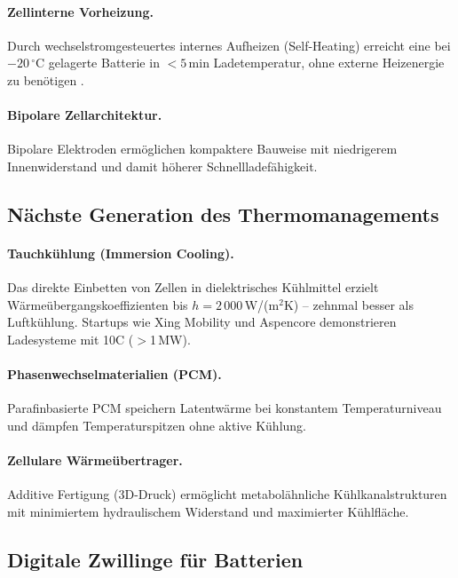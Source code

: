 ﻿\documentclass[a4paper,12pt]{article}
\theoremstyle{definition}
\begin{document}
\paragraph{Zellinterne Vorheizung.}
Durch wechselstromgesteuertes internes Aufheizen (Self-Heating) erreicht
eine bei $-20\,^{\circ}\mathrm{C}$ gelagerte Batterie in $<5$\,min Ladetemperatur, ohne
externe Heizenergie zu ben\"otigen \cite{Wang2019}.

\paragraph{Bipolare Zellarchitektur.}
Bipolare Elektroden ermöglichen kompaktere Bauweise mit niedrigerem
Innenwiderstand und damit h\"oherer Schnellladef\"ahigkeit.

\subsection{N\"achste Generation des Thermomanagements}

\paragraph{Tauchk\"uhlung (Immersion Cooling).}
Das direkte Einbetten von Zellen in dielektrisches K\"uhlmittel erzielt
W\"arme\"ubergangskoeffizienten bis $h = 2\,000$\,W/(m$^2$K) --
zehnmal besser als Luftk\"uhlung. Startups wie Xing Mobility und
Aspencore demonstrieren Ladesysteme mit 10C ($>$1\,MW).

\paragraph{Phasenwechselmaterialien (PCM).}
Parafinbasierte PCM speichern Latentwärme bei konstantem Temperaturniveau
und d\"ampfen Temperaturspitzen ohne aktive K\"uhlung.

\paragraph{Zellulare W\"arme\"ubertrager.}
Additive Fertigung (3D-Druck) erm\"oglicht metabol\"ahnliche K\"uhlkanalstrukturen
mit minimiertem hydraulischem Widerstand und maximierter K\"uhlfl\"ache.

\subsection{Digitale Zwillinge f\"ur Batterien}
\end{document}
